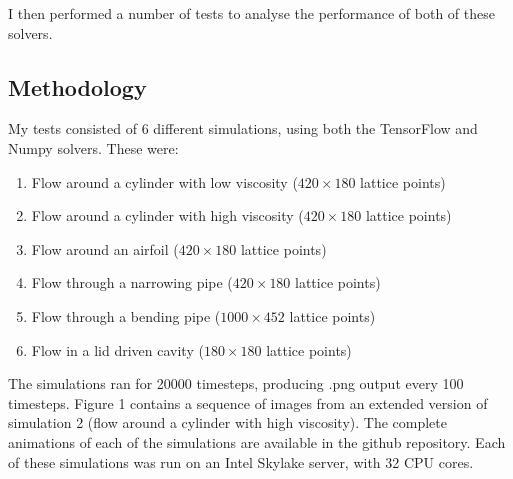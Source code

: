 \documentclass{article}
\begin{document}
I then performed a number of tests to analyse the performance of both of these solvers.

\subsection{Methodology}

My tests consisted of 6 different simulations, using both the TensorFlow and Numpy solvers. These were:

\begin{enumerate}
    \item Flow around a cylinder with low viscosity ($420\times180$ lattice points)
    \item Flow around a cylinder with high viscosity ($420\times180$ lattice points)
    \item Flow around an airfoil ($420\times180$ lattice points)
    \item Flow through a narrowing pipe ($420\times180$ lattice points)
    \item Flow through a bending pipe ($1000\times452$ lattice points)
    \item Flow in a lid driven cavity ($180\times180$ lattice points)
\end{enumerate}

The simulations ran for 20000 timesteps, producing .png output every 100 timesteps. Figure 1 contains a sequence of images from an extended version of simulation 2 (flow around a cylinder with high viscosity). The complete animations of each of the simulations are available in the github repository. Each of these simulations was run on an Intel Skylake server, with 32 CPU cores.
\end{document}
